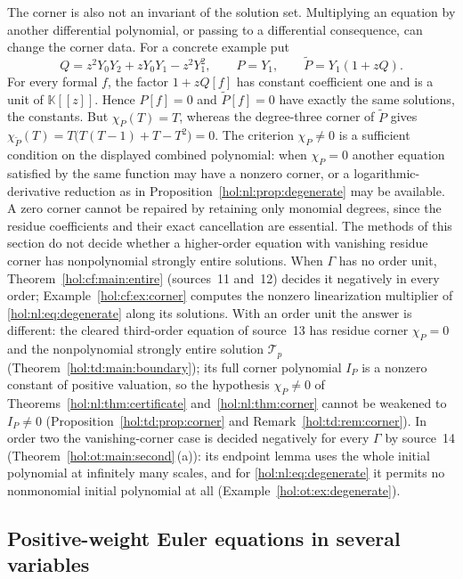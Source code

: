 \documentclass[11pt]{article}
\numberwithin{equation}{section}
\theoremstyle{definition}
\theoremstyle{remark}
\newcommand{\KK}{\mathbb K}
\begin{document}
The corner is also not an invariant of the solution set. Multiplying an
equation by another differential polynomial, or passing to a differential
consequence, can change the corner data. For a concrete example put
\[
 Q=z^2Y_0Y_2+zY_0Y_1-z^2Y_1^2,\qquad
 P=Y_1,\qquad \widetilde P=Y_1(1+zQ).
\]
For every formal $f$, the factor $1+zQ[f]$ has constant coefficient one and
is a unit of $\KK[[z]]$. Hence $P[f]=0$ and $\widetilde P[f]=0$ have exactly
the same solutions, the constants. But $\chi_P(T)=T$, whereas the degree-three
corner of $\widetilde P$ gives
$\chi_{\widetilde P}(T)=T\bigl(T(T-1)+T-T^2\bigr)=0$.
The criterion $\chi_P\ne0$ is a
sufficient condition on the displayed combined polynomial: when $\chi_P=0$
another equation satisfied by the same function may have a nonzero corner, or
a logarithmic-derivative reduction as in
Proposition~\ref{hol:nl:prop:degenerate} may be available. A zero corner
cannot be repaired by retaining only monomial degrees, since the residue
coefficients and their exact cancellation are essential. The methods of this
section do not decide whether a higher-order equation with vanishing residue
corner has nonpolynomial strongly entire solutions. When $\Gamma$ has no
order unit, Theorem~\ref{hol:cf:main:entire} (sources~11 and~12) decides it
negatively in every order; Example~\ref{hol:cf:ex:corner} computes the
nonzero linearization multiplier of \eqref{hol:nl:eq:degenerate} along its
solutions. With an order unit the answer is different: the cleared
third-order equation of source~13 has residue corner $\chi_P=0$ and the
nonpolynomial strongly entire solution $\mathcal T_p$
(Theorem~\ref{hol:td:main:boundary}); its full corner polynomial $I_P$ is a
nonzero constant of positive valuation, so the hypothesis $\chi_P\ne0$ of
Theorems~\ref{hol:nl:thm:certificate} and~\ref{hol:nl:thm:corner} cannot be
weakened to $I_P\ne0$ (Proposition~\ref{hol:td:prop:corner} and
Remark~\ref{hol:td:rem:corner}). In order two the vanishing-corner case is
decided negatively for every $\Gamma$ by source~14
(Theorem~\ref{hol:ot:main:second}\,(a)): its endpoint lemma uses the whole
initial polynomial at infinitely many scales, and for
\eqref{hol:nl:eq:degenerate} it permits no nonmonomial initial polynomial at
all (Example~\ref{hol:ot:ex:degenerate}).

\subsection{Positive-weight Euler equations in several variables}
\label{hol:nl:sub:euler}
\end{document}
